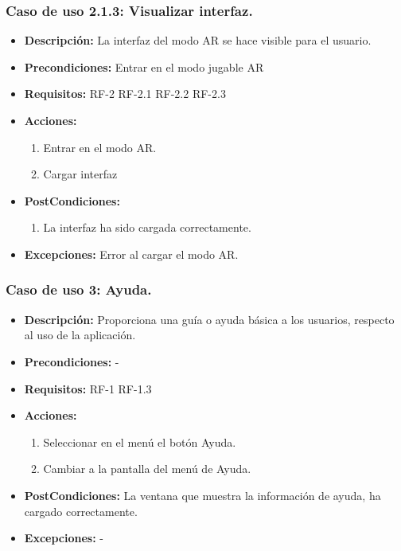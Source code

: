 \subsubsection{Caso de uso  2.1.3: Visualizar interfaz.}
\begin{itemize}
	\item \textbf{Descripción:} La interfaz del modo AR se hace visible para el usuario.
	\item \textbf{Precondiciones:} Entrar en el modo jugable AR
	\item \textbf{Requisitos:} RF-2 RF-2.1 RF-2.2 RF-2.3
	\item \textbf{Acciones:}
		\begin{enumerate}
			\item Entrar en el modo AR.
			\item Cargar interfaz
		\end{enumerate}
	\item \textbf{PostCondiciones:}
		\begin{enumerate}
			\item La interfaz ha sido cargada correctamente.
		\end{enumerate}
	\item \textbf{Excepciones:} Error al cargar el modo AR.
\end{itemize}
\subsubsection{Caso de uso 3: Ayuda.}
\begin{itemize}
	\item \textbf{Descripción:} Proporciona una guía o ayuda básica a los usuarios, respecto al uso de la aplicación.
	\item \textbf{Precondiciones:} -
	\item \textbf{Requisitos:} RF-1 RF-1.3
	\item \textbf{Acciones:}
	\begin{enumerate}
		\item Seleccionar en el menú el botón Ayuda.
		\item Cambiar a la pantalla del menú de Ayuda.
	\end{enumerate}
	\item \textbf{PostCondiciones:} La ventana que muestra la información de ayuda, ha cargado correctamente.
	\item \textbf{Excepciones:} -
\end{itemize}
